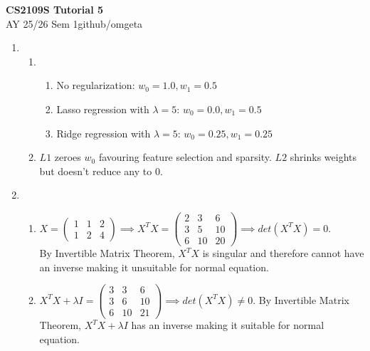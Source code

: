 \documentclass[12pt, a4paper]{article}
\newcommand{\mytitle}{CS2109S Tutorial 5}
\newcommand{\myauthor}{github/omgeta}
\newcommand{\mydate}{AY 25/26 Sem 1}
\begin{document}
\raggedright
\footnotesize
\begin{center}
{\normalsize{\textbf{\mytitle}}} \\
{\footnotesize{\mydate\hspace{2pt}\textemdash\hspace{2pt}\myauthor}}
\end{center}
\begin{enumerate}[\Alph*.]
  \item 
    \begin{enumerate}[\arabic*.]
      \item 
        \begin{enumerate}[(\alph*)]
          \item No regularization: $w_0 = 1.0, w_1 = 0.5$ 
          \item Lasso regression with $\lambda = 5$: $w_0 = 0.0, w_1 = 0.5$
          \item Ridge regression with $\lambda = 5$: $w_0 = 0.25, w_1 = 0.25$
        \end{enumerate}

      \item $L1$ zeroes $w_0$ favouring feature selection and sparsity. $L2$ shrinks weights but doesn't reduce any to $0$.
    \end{enumerate}

  \item 
    \begin{enumerate}[\arabic*.]
      \item $X = \left(\begin{array}{ccc} 1 & 1 & 2\\ 1 & 2 & 4 \end{array}\right) \implies X^TX = \left(\begin{array}{ccc} 2 & 3 & 6\\ 3 & 5 & 10\\ 6 & 10 & 20 \end{array}\right) \implies det(X^TX) = 0$.\\By Invertible Matrix Theorem, $X^TX$ is singular and therefore cannot have an inverse making it unsuitable for normal equation. 

      \item $X^TX + \lambda I = \left(\begin{array}{ccc} 3& 3 & 6\\ 3 & 6 & 10\\ 6 & 10 & 21 \end{array}\right) \implies det(X^TX) \neq 0$. By Invertible Matrix Theorem, $X^TX + \lambda I$ has an inverse making it suitable for normal equation. 


\end{enumerate}
\end{enumerate}
\end{document}

